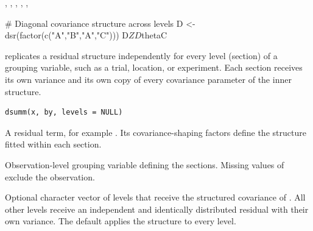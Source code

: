 \documentclass[a4paper]{book}
\begin{document}
%
\begin{SeeAlso}\relax
{}, , , ,
, 
\end{SeeAlso}
%
\begin{Examples}
\begin{ExampleCode}
# Diagonal covariance structure across levels
D <- dsr(factor(c("A","B","A","C")))
D$Z
D$thetaC
\end{ExampleCode}
\end{Examples}
%
\begin{Description}\relax
{} replicates a residual  structure independently for
every level (section) of a grouping variable, such as a trial, location, or
experiment. Each section receives its own variance and its own copy of every
covariance parameter of the inner structure.
\end{Description}
%
\begin{Usage}
\begin{verbatim}
dsumm(x, by, levels = NULL)
\end{verbatim}
\end{Usage}
%
\begin{Arguments}
\begin{ldescription}
\item[\code{x}] A residual  term, for example
. Its covariance-shaping
factors define the structure fitted within each section.
\item[\code{by}] Observation-level grouping variable defining the sections. Missing
values of  exclude the observation.
\item[\code{levels}] Optional character vector of  levels that receive the
structured covariance of . All other levels receive an independent
and identically distributed residual with their own variance. The default
 applies the structure to every level.
\end{ldescription}
\end{Arguments}
%
\end{document}
